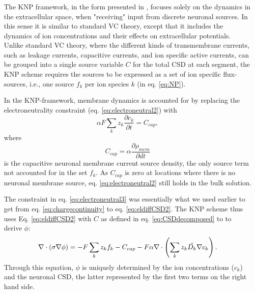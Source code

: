\subsubsection{}
The KNP framework, in the form presented in \cite{Solbra2018}, focuses solely on the dynamics in the extracellular space, when "receiving" input from discrete neuronal sources. In this sense it is similar to standard VC theory, except that it includes the dynamics of ion concentrations and their effects on extracellular potentials. Unlike standard VC theory, where the different kinds of transmembrane currents, such as leakage currents, capacitive currents, and ion specific active currents, can be grouped into a single source variable $C$ for the total CSD at each segment, the KNP scheme requires the sources to be expressed as a set of ion specific flux-sources, i.e., one source $f_k$ per ion species $k$ (in eq. \ref{eq:NP}). 

In the KNP-framework, membrane dynamics is accounted for by replacing the electroneutrality constraint (eq. \ref{eq:electroneutral2}) with
\begin{equation}
\alpha F \sum_k{z_k \frac{\partial c_k}{\partial t}} = C_{cap},
\label{eq:electroneutral3}
\end{equation}
where \begin{equation}
C_{cap} = {\alpha}\frac{\partial \rho_{mem}}{\partial dt}
\label{eq:Andreas}
\end{equation}
is the capacitive neuronal membrane current source density, the only source term not accounted for in the set $f_k$. As $C_{cap}$ is zero at locations where there is no neuronal membrane source, eq. \ref{eq:electroneutral2} still holds in the bulk solution. 

The constraint in eq. \ref{eq:electroneutral3} was essentially what we used earlier to get from eq. \ref{eq:chargecontinuity} to eq. \ref{eq:eldiffCSD2}. The KNP scheme thus uses Eq. \ref{eq:eldiffCSD2} with $C$ as defined in eq.  \ref{eq:CSDdecomposed} to to derive $\phi$:
\begin{equation}
\nabla \cdot (\sigma\nabla\phi) = - F \sum_k z_k f_k -  C_{cap} - F\alpha \nabla \cdot \left (\sum_k{z_k \tilde{D_k}{\bf \nabla} c_{k}} \right).
\label{eq:KNPfinal}
\end{equation}
Through this equation, $\phi$ is uniquely determined by the ion concentrations ($c_k$) and the neuronal CSD, the latter represented by the first two terms on the right hand side.


